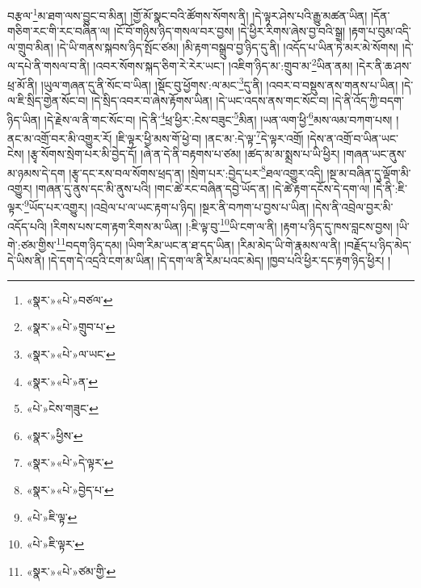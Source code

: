 བརྩལ་\footnote{«སྣར་»«པེ་»བཙལ་}མ་ཐག་ལས་བྱུང་བ་མིན། །གྱོ་མོ་སྣང་བའི་ཚོགས་སོགས་ནི། །དེ་ལྟར་ཤེས་པའི་རྒྱུ་མཚན་ཡིན། །དོན་གཅིག་རང་གི་རང་བཞིན་ལ། །ངོ་བོ་གཉིས་ཉིད་གསལ་བར་བྱས། །དེ་ཕྱིར་རིགས་ཞེས་བྱ་བའི་སྒྲ། །རྟག་པ་བུམ་འདི་ལ་གྲུབ་མིན། །དེ་ཡི་གནས་སྐབས་ཉིད་སྤོང་ཙམ། །མི་རྟག་བསྒྲུབ་བྱ་ཉིད་དུ་ནི། །འདོད་པ་ཡིན་ཏེ་མར་མེ་སོགས། །དེ་ལ་དཔེ་ནི་གསལ་བ་ནི། །འབར་སོགས་སྐད་ཅིག་རེ་རེར་ཡང་། །འཇིག་ཉིད་མ་:གྲུབ་མ་\footnote{«སྣར་»«པེ་»གྲུབ་པ་}ཡིན་ནམ། །དེར་ནི་ཆ་ཤས་ཕྲ་མོ་ནི། །ཡུལ་གཞན་དུ་ནི་སོང་བ་ཡིན། །སྡོང་བུ་ཕྱོགས་:ལ་མང་\footnote{«སྣར་»«པེ་»ལ་ཡང་}དུ་ནི། །འབར་བ་བསྡུས་ནས་གནས་པ་ཡིན། །དེ་ལ་ཇི་སྲིད་གྱེན་སོང་བ། །དེ་སྲིད་འབར་བ་ཞེས་རྟོགས་ཡིན། །དེ་ཡང་འདས་ནས་གང་སོང་བ། །དེ་ནི་འོད་ཀྱི་བདག་ཉིད་ཡིན། །དེ་རྗེས་ལ་ནི་གང་སོང་བ། །དེ་ནི་\footnote{«སྣར་»«པེ་»ན་}ཕྲ་ཕྱིར་:ངེས་བཟུང་\footnote{«པེ་»ངེས་གཟུང་}མིན། །ཡན་ལག་ཕྱི་\footnote{«སྣར་»ཕྱིས་}མས་ལམ་བཀག་པས། །ནང་མ་འགྲོ་བར་མི་འགྱུར་རོ། །ཇི་ལྟར་ཕྱི་མས་གོ་ཕྱེ་བ། །ནང་མ་:དེ་ལྟ་\footnote{«སྣར་»«པེ་»དེ་ལྟར་}དེ་ལྟར་འགྲོ། །དེས་ན་འགྲོ་བ་ཡིན་ཡང་ངེས། །རྩྭ་སོགས་སྲེག་པར་མི་བྱེད་དོ། །ཞེ་ན་དེ་ནི་བརྟགས་པ་ཙམ། །ཚད་མ་མ་སྨྲས་པ་ཡི་ཕྱིར། །གཞན་ཡང་ནུས་མ་ཉམས་དེ་དག །རྩྭ་དང་རས་བལ་སོགས་ཕྲད་ན། །སྲེག་པར་:བྱེད་པར་\footnote{«སྣར་»«པེ་»བྱེད་པ་}ཐལ་འགྱུར་འདི། །སྔ་མ་བཞིན་དུ་ལྡོག་མི་འགྱུར། །གཞན་དུ་ནུས་དང་མི་ནུས་པའི། །གང་ཚེ་རང་བཞིན་དབྱེ་ཡོད་ན། །དེ་ཚེ་རྟག་དངོས་དེ་དག་ལ། །དེ་ནི་:ཇི་ལྟར་\footnote{«པེ་»ཇི་ལྟ་}ཡོད་པར་འགྱུར། །འབྲེལ་པ་ལ་ཡང་རྟག་པ་ཉིད། །སྔར་ནི་བཀག་པ་བྱས་པ་ཡིན། །དེས་ནི་འབྲེལ་བྱར་མི་འདོད་པའི། །རིགས་པས་ངག་རྟག་རིགས་མ་ཡིན། །:ཇི་ལྟ་བུ་\footnote{«པེ་»ཇི་ལྟར་}ཡི་ངག་ལ་ནི། །རྟག་པ་ཉིད་དུ་ཁས་བླངས་བྱས། །ཡི་གེ་:ཙམ་གྱིས་\footnote{«སྣར་»«པེ་»ཙམ་གྱི་}བདག་ཉིད་དམ། །ཡིག་རིམ་ཡང་ན་ཐ་དད་ཡིན། །རིམ་མེད་ཡི་གེ་རྣམས་ལ་ནི། །བརྗོད་པ་ཉིད་མེད་དེ་ཡིས་ནི། །དེ་དག་དེ་འདྲའི་ངག་མ་ཡིན། །དེ་དག་ལ་ནི་རིམ་པའང་མེད། །ཁྱབ་པའི་ཕྱིར་དང་རྟག་ཉིད་ཕྱིར། །
